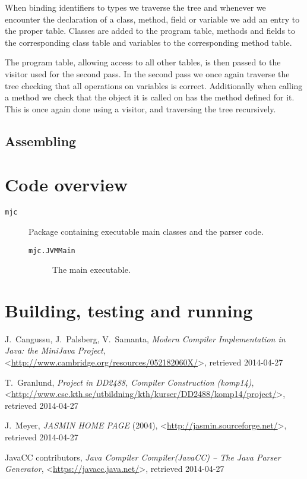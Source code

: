 \documentclass[a4paper]{article}
\begin{document}
When binding identifiers to types we traverse the tree and whenever we encounter
the declaration of a class, method, field or variable we add an entry to the
proper table. Classes are added to the program table, methods and fields to the
corresponding class table and variables to the corresponding method table.

The program table, allowing access to all other tables, is then passed to the
visitor used for the second pass. In the second pass we once again traverse the
tree checking that all operations on variables is correct. Additionally when
calling a method we check that the object it is called on has the method defined
for it. This is once again done using a visitor, and traversing the tree
recursively.

\subsection{Assembling}


\section{Code overview}

\begin{description}
\item[\texttt{mjc}] Package containing executable main classes and the parser
    code.
    \begin{description}
        \item[\texttt{mjc.JVMMain}] The main executable.
    \end{description}
\end{description}

\section{Building, testing and running}

\begin{thebibliography}{99}

    J.~Cangussu, J.~Palsberg, V.~Samanta,
    \emph{Modern Compiler Implementation in Java: the MiniJava Project},
    <\url{http://www.cambridge.org/resources/052182060X/}>, retrieved 2014-04-27

    T.~Granlund,
    \emph{Project in DD2488, Compiler Construction (komp14)},
    <\url{http://www.csc.kth.se/utbildning/kth/kurser/DD2488/komp14/project/}>, retrieved 2014-04-27

    J.~Meyer,
    \emph{JASMIN HOME PAGE} (2004),
    <\url{http://jasmin.sourceforge.net/}>, retrieved 2014-04-27

    JavaCC contributors,
    \emph{Java Compiler Compiler\texttrademark (JavaCC\texttrademark) -- The Java Parser Generator},
    <\url{https://javacc.java.net/}>, retrieved 2014-04-27

\end{thebibliography}
\end{document}
